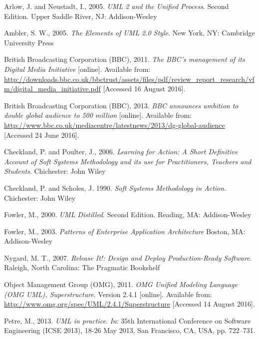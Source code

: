 \documentclass{article}
\begin{document}
\clearpage

\begin{thebibliography}{9}

Arlow, J. and Neustadt, I., 2005.
\textit{UML 2 and the Unified Process}. Second Edition.
Upper Saddle River, NJ: Addison-Wesley

Ambler, S. W., 2005.
\textit{The Elements of UML 2.0 Style}.
New York, NY: Cambridge University Press

British Broadcasting Corporation (BBC), 2011.
\textit{The BBC's management of its Digital Media Initiative} [online].
Available from: \url{http://downloads.bbc.co.uk/bbctrust/assets/files/pdf/review_report_research/vfm/digital_media_initiative.pdf} [Accessed 16 August 2016].

British Broadcasting Corporation (BBC), 2013.
\textit{BBC announces ambition to double global audience to 500 million} [online].
Available from: \url{http://www.bbc.co.uk/mediacentre/latestnews/2013/dg-global-audience} [Accessed 24 June 2016].

Checkland, P. and Poulter, J., 2006.
\textit{Learning for Action: A Short Definitive Account of Soft Systems Methodology and its use for Practitioners, Teachers and Students}.
Chichester: John Wiley

Checkland, P. and Scholes, J. 1990.
\textit{Soft Systems Methodology in Action}.
Chichester: John Wiley

Fowler, M., 2000.
\textit{UML Distilled}. Second Edition.
Reading, MA: Addison-Wesley

Fowler, M., 2003.
\textit{Patterns of Enterprise Application Architecture}
Boston, MA: Addison-Wesley

Nygard, M. T., 2007.
\textit{Release It!: Design and Deploy Production-Ready Software}.
Raleigh, North Carolina: The Pragmatic Bookshelf

Object Management Group (OMG), 2011.
\textit{OMG Unified Modeling Language (OMG UML), Superstructure}. Version 2.4.1 [online].
Available from: \url{http://www.omg.org/spec/UML/2.4.1/Superstructure} [Accessed 14 August 2016].

Petre, M., 2013.
\textit{UML in practice}. \textit{In}: 35th International Conference on Software Engineering (ICSE 2013), 18-26 May 2013, San Francisco, CA, USA, pp. 722–731.


\end{thebibliography}
\end{document}
